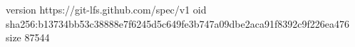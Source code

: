version https://git-lfs.github.com/spec/v1
oid sha256:b13734bb53c38888e7f6245d5c649fe3b747a09dbe2aca91f8392c9f226ea476
size 87544
